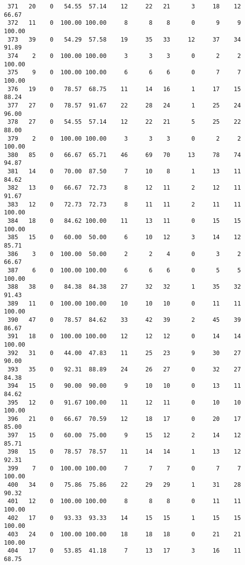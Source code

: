 \begin{verbatim}
 371   20    0   54.55  57.14    12     22   21      3     18    12    66.67
 372   11    0  100.00 100.00     8      8    8      0      9     9   100.00
 373   39    0   54.29  57.58    19     35   33     12     37    34    91.89
 374    2    0  100.00 100.00     3      3    3      0      2     2   100.00
 375    9    0  100.00 100.00     6      6    6      0      7     7   100.00
 376   19    0   78.57  68.75    11     14   16      1     17    15    88.24
 377   27    0   78.57  91.67    22     28   24      1     25    24    96.00
 378   27    0   54.55  57.14    12     22   21      5     25    22    88.00
 379    2    0  100.00 100.00     3      3    3      0      2     2   100.00
 380   85    0   66.67  65.71    46     69   70     13     78    74    94.87
 381   14    0   70.00  87.50     7     10    8      1     13    11    84.62
 382   13    0   66.67  72.73     8     12   11      2     12    11    91.67
 383   12    0   72.73  72.73     8     11   11      2     11    11   100.00
 384   18    0   84.62 100.00    11     13   11      0     15    15   100.00
 385   15    0   60.00  50.00     6     10   12      3     14    12    85.71
 386    3    0  100.00  50.00     2      2    4      0      3     2    66.67
 387    6    0  100.00 100.00     6      6    6      0      5     5   100.00
 388   38    0   84.38  84.38    27     32   32      1     35    32    91.43
 389   11    0  100.00 100.00    10     10   10      0     11    11   100.00
 390   47    0   78.57  84.62    33     42   39      2     45    39    86.67
 391   18    0  100.00 100.00    12     12   12      0     14    14   100.00
 392   31    0   44.00  47.83    11     25   23      9     30    27    90.00
 393   35    0   92.31  88.89    24     26   27      0     32    27    84.38
 394   15    0   90.00  90.00     9     10   10      0     13    11    84.62
 395   12    0   91.67 100.00    11     12   11      0     10    10   100.00
 396   21    0   66.67  70.59    12     18   17      0     20    17    85.00
 397   15    0   60.00  75.00     9     15   12      2     14    12    85.71
 398   15    0   78.57  78.57    11     14   14      1     13    12    92.31
 399    7    0  100.00 100.00     7      7    7      0      7     7   100.00
 400   34    0   75.86  75.86    22     29   29      1     31    28    90.32
 401   12    0  100.00 100.00     8      8    8      0     11    11   100.00
 402   17    0   93.33  93.33    14     15   15      1     15    15   100.00
 403   24    0  100.00 100.00    18     18   18      0     21    21   100.00
 404   17    0   53.85  41.18     7     13   17      3     16    11    68.75

\end{verbatim}
